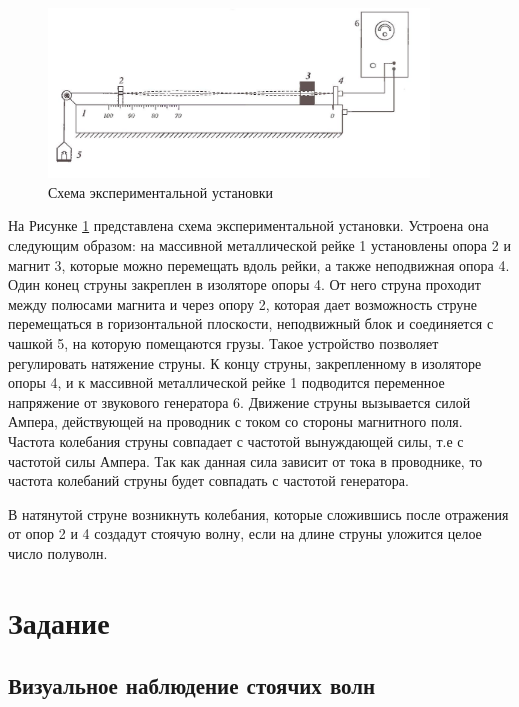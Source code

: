 \documentclass[a4paper,12pt]{article}
\begin{document}
	\begin{figure}[h!]
		\begin{center}
			\includegraphics[width = 0.9\textwidth]{1.4.5 ustan}
			\caption{Схема экспериментальной установки}
			\label{facility}
		\end{center}
	\end{figure}
	
	На Рисунке \ref{facility} представлена схема экспериментальной установки. Устроена она следующим образом: на массивной металлической рейке 1 установлены опора 2 и магнит 3, которые можно перемещать вдоль рейки, а также неподвижная опора 4. Один конец струны закреплен в изоляторе опоры 4. От него струна проходит между полюсами магнита и через опору 2, которая дает возможность струне перемещаться в горизонтальной плоскости, неподвижный блок и соединяется с чашкой 5, на которую помещаются грузы. Такое устройство позволяет регулировать натяжение струны.  К концу струны, закрепленному в изоляторе опоры 4, и к массивной металлической рейке 1 подводится переменное напряжение от звукового генератора 6. Движение струны вызывается силой Ампера, действующей на проводник с током со стороны магнитного поля. Частота колебания струны совпадает с частотой вынуждающей силы, т.е с частотой силы Ампера. Так как данная сила зависит от тока в проводнике, то частота колебаний струны будет совпадать с частотой генератора.
	
	В натянутой струне возникнуть колебания, которые сложившись после отражения от опор 2 и 4 создадут стоячую волну, если на длине струны уложится целое число полуволн.
	
	\section{Задание}
	\subsection{Визуальное наблюдение стоячих волн}
	
\end{document}
